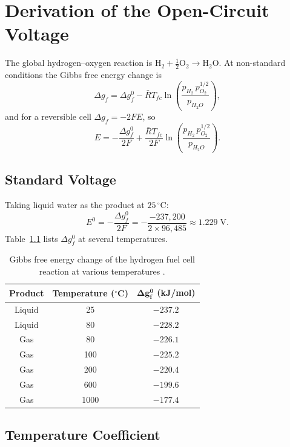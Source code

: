 
\chapter{Derivation of the Open-Circuit Voltage}

\label{app:ocv}

The global hydrogen--oxygen reaction is
$\mathrm{H_2+\tfrac{1}{2}O_2\rightarrow H_2O}$. At non-standard conditions the
Gibbs free energy change is
\[
    \Delta g_f = \Delta g_f^0
    - \bar{R}T_{fc}\ln\!\left(\frac{p_{H_2}\,p_{O_2}^{1/2}}{p_{H_2O}}\right),
\]
and for a reversible cell $\Delta g_f=-2FE$, so
\[
    E = -\frac{\Delta g_f^0}{2F}
      + \frac{\bar{R}T_{fc}}{2F}
        \ln\!\left(\frac{p_{H_2}\,p_{O_2}^{1/2}}{p_{H_2O}}\right).
\]

\section*{Standard Voltage}

Taking liquid water as the product at $25\,^{\circ}$C:
\[
    E^0=-\frac{\Delta g_f^0}{2F}
       =-\frac{-237{,}200}{2\times 96{,}485}\approx 1.229\;\mathrm{V}.
\]
Table~\ref{tab:gibbs} lists $\Delta g_f^0$ at several temperatures.

\begin{table}[H]
\centering
\caption{Gibbs free energy change of the hydrogen fuel cell reaction at various temperatures \cite{pukrushpan2003}.}
\label{tab:gibbs}
\begin{tabular}{ccc}
\toprule
\textbf{Product} & \textbf{Temperature ($^{\circ}$C)} & $\boldsymbol{\Delta g_f^0}$ \textbf{(kJ/mol)} \\
\midrule
Liquid & 25   & $-237.2$ \\
Liquid & 80   & $-228.2$ \\
Gas    & 80   & $-226.1$ \\
Gas    & 100  & $-225.2$ \\
Gas    & 200  & $-220.4$ \\
Gas    & 600  & $-199.6$ \\
Gas    & 1000 & $-177.4$ \\
\bottomrule
\end{tabular}
\end{table}

\section*{Temperature Coefficient}

